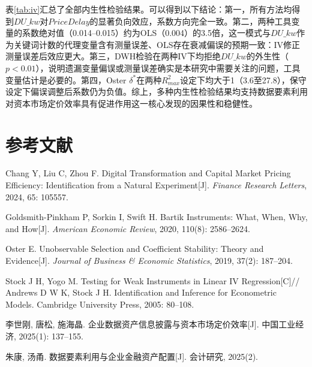 \documentclass[11pt,a4paper]{article}
\begin{document}
表\ref{tab:iv}汇总了全部内生性检验结果。可以得到以下结论：第一，所有方法均得到$DU\_kw$对$PriceDelay$的显著负向效应，系数方向完全一致。第二，两种工具变量的系数绝对值（0.014--0.015）约为OLS（0.004）的3.5倍，这一模式与$DU\_kw$作为关键词计数的代理变量含有测量误差、OLS存在衰减偏误的预期一致：IV修正测量误差后效应更大。第三，DWH检验在两种IV下均拒绝$DU\_kw$的外生性（$p<0.01$），说明遗漏变量偏误或测量误差确实是本研究中需要关注的问题，工具变量估计是必要的。第四，Oster $\delta^*$在两种$R^2_{max}$设定下均大于1（3.6至27.8），保守设定下偏误调整后系数仍为负值。综上，多种内生性检验结果均支持数据要素利用对资本市场定价效率具有促进作用这一核心发现的因果性和稳健性。

\section*{参考文献}

\begin{enumerate}[label={[\arabic*]}, leftmargin=2em, itemsep=3pt]

\item Chang Y, Liu C, Zhou F. Digital Transformation and Capital Market Pricing Efficiency: Identification from a Natural Experiment[J]. \textit{Finance Research Letters}, 2024, 65: 105557.

\item Goldsmith-Pinkham P, Sorkin I, Swift H. Bartik Instruments: What, When, Why, and How[J]. \textit{American Economic Review}, 2020, 110(8): 2586--2624.

\item Oster E. Unobservable Selection and Coefficient Stability: Theory and Evidence[J]. \textit{Journal of Business \& Economic Statistics}, 2019, 37(2): 187--204.

\item Stock J H, Yogo M. Testing for Weak Instruments in Linear IV Regression[C]// Andrews D W K, Stock J H. Identification and Inference for Econometric Models. Cambridge University Press, 2005: 80--108.

\item 李世刚, 唐松, 施海晶. 企业数据资产信息披露与资本市场定价效率[J]. 中国工业经济, 2025(1): 137--155.

\item 朱康, 汤甬. 数据要素利用与企业金融资产配置[J]. 会计研究, 2025(2).

\end{enumerate}
\end{document}
